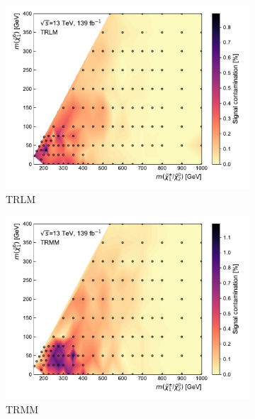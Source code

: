  \begin{figure}
	\centering
	\begin{subfigure}[b]{0.5\linewidth}
		\centering\includegraphics[width=1.0\textwidth]{signal_contamination/plot_TRLM}
		\caption{TRLM\label{fig:signal_contamination_TRLM}}
	\end{subfigure}\hfill
	\begin{subfigure}[b]{0.5\linewidth}
		\centering\includegraphics[width=1.0\textwidth]{signal_contamination/plot_TRMM}
		\caption{TRMM\label{fig:signal_contamination_TRMM}}
	\end{subfigure}\hfill
	\begin{subfigure}[b]{0.5\linewidth}

\end{subfigure}
\end{figure}
